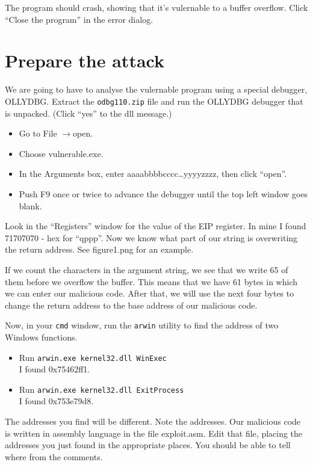 \documentclass{article}
\begin{document}
The program should crash, showing that it's vulernable to a buffer overflow. Click ``Close the program'' in the error dialog.

\section{Prepare the attack}
We are going to have to analyse the vulernable program using a special debugger, OLLYDBG.  Extract
the \texttt{odbg110.zip} file and run the OLLYDBG debugger that is unpacked. (Click ``yes'' to 
the dll message.)

\begin{itemize}
	\item Go to File $\rightarrow$open.
	\item Choose vulnerable.exe.
	\item In the Arguments box, enter aaaabbbbcccc\ldots yyyyzzzz, then click ``open''.
	\item Push F9 once or twice to advance the debugger until the top left window 
		goes blank.
\end{itemize}
Look in the ``Registers'' window for the value of the EIP register.  In mine I found 
71707070 - hex for ``qppp''. Now we know what part of our string is overwriting the return address. See figure1.png for an example.

If we count the characters in the argument string, we see that we write 65 of them before we overflow 
the buffer.  This means that we have 61 bytes in which we can enter our malicious code.  After that, we will use the next four bytes to change the return address to the base address of our malicious code.

Now, in your \texttt{cmd} window, run the \texttt{arwin} utility to find the address of two 
Windows functions.

\begin{itemize}
	\item Run \texttt{arwin.exe kernel32.dll WinExec} \\
		I found 0x75462ff1.
	\item Run \texttt{arwin.exe kernel32.dll ExitProcess} \\
		I found 0x753e79d8.
\end{itemize}

The addresses you find will be different.  Note the addresses. Our malicious code is written in assembly language in the file exploit.asm.  Edit that file, placing the addresses you just found in the appropriate places. You should be able to tell where from the comments.
\end{document}
